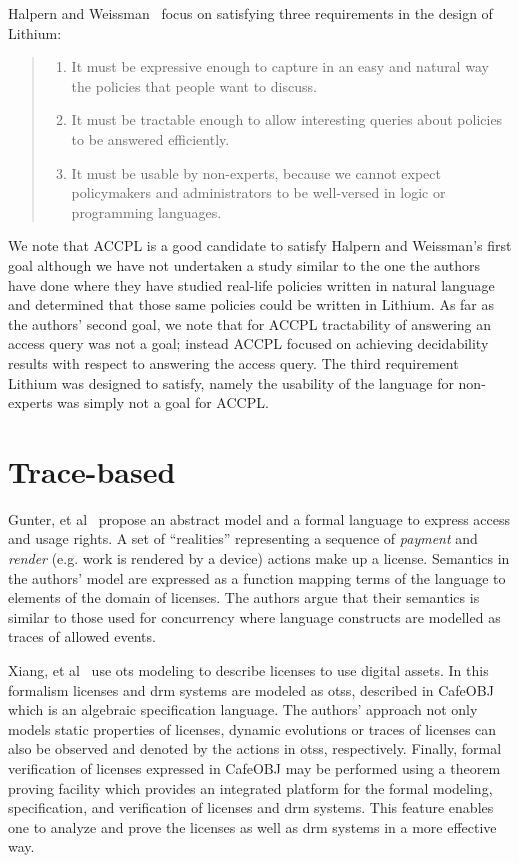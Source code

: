 Halpern and Weissman~\cite{Halpern2008} focus on satisfying three requirements in the design of Lithium:
\begin{quote}
\begin{enumerate}
  \item It must be expressive enough to capture in an easy and natural way the policies that people want to discuss.
  \item It must be tractable enough to allow interesting queries about policies to be answered efficiently.
  \item It must be usable by non-experts, because we cannot expect policymakers and administrators to be well-versed in logic or programming languages.
\end{enumerate}
\end{quote}
 We note that \ac{ACCPL} is a good candidate to satisfy Halpern and Weissman's first goal although we have not undertaken a study similar to the one the authors have done where they have studied real-life policies written in natural language and determined that those same policies could be written in Lithium. As far as the authors' second goal, we note that for \ac{ACCPL} tractability of answering an access query was not a goal; instead \ac{ACCPL} focused on achieving decidability results with respect to answering the access query. The third requirement Lithium was designed to satisfy, namely the usability of the language for non-experts was simply not a goal for \ac{ACCPL}. 

\section{Trace-based}
Gunter, et al~\cite{GunterWW01} propose an abstract model and a formal language to express access and usage rights. A set of ``realities'' representing a sequence of \emph{payment} and \emph{render} (e.g. work is rendered by a device) actions make up a license. Semantics in the authors' model are expressed as a function mapping terms of the language to elements of the domain of licenses. The authors argue that their semantics is similar to those used for concurrency where language constructs are modelled as traces of allowed events.

Xiang, et al~\cite{xiang2008formal} use \ac{ots} modeling to describe licenses to use digital assets. In this formalism licenses and \ac{drm} systems are modeled as \ac{ots}s, described in CafeOBJ~\cite{cafeobj} which is an algebraic specification language. The authors' approach not only models static properties of licenses, dynamic evolutions or traces of licenses can also be observed and denoted by the actions in \ac{ots}s, respectively. Finally, formal verification of licenses expressed in CafeOBJ may be performed using a theorem proving facility which provides an integrated platform for the formal modeling, specification, and verification of licenses and \ac{drm} systems. This feature enables one to analyze and prove the licenses as well as \ac{drm} systems in a more effective way.

